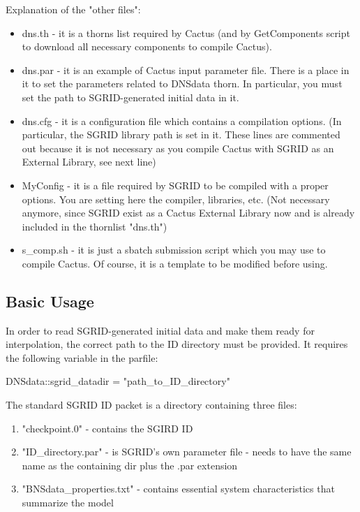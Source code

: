 Explanation of the "other files":

\begin{itemize}
\item dns.th - it is a thorns list required by Cactus (and by GetComponents script to download all necessary components to compile Cactus).
\item dns.par - it is an example of Cactus input parameter file. There is a place in it to set the parameters related to DNSdata thorn. In particular, you must set the path to SGRID-generated initial data in it.
\item dns.cfg - it is a configuration file which contains a compilation options. (In particular, the SGRID library path is set in it. These lines are commented out because it is not necessary as you compile Cactus with SGRID as an External Library, see next line)
\item MyConfig  - it is a file required by SGRID to be compiled with a proper options. You are setting here the compiler, libraries, etc. (Not necessary anymore, since SGRID exist as a Cactus External Library now and is already included in the thornlist "dns.th")
\item s\_comp.sh - it is just a sbatch submission script which you may use to compile Cactus. Of course, it is a template to be modified before using.
\end{itemize}

\subsection{Basic Usage}

In order to read SGRID-generated initial data and make them ready for
interpolation, the correct path to the ID directory must be provided. It
requires the following variable in the parfile:

DNSdata::sgrid\_datadir = "path\_to\_ID\_directory"

The standard SGRID ID packet is a directory containing three files:
\begin{enumerate}
\item "checkpoint.0" - contains the SGIRD ID
\item "ID\_directory.par" - is SGRID's own parameter file - needs to have the same name as the containing dir plus the .par extension
\item "BNSdata\_properties.txt" - contains essential system characteristics that summarize the model
\end{enumerate}

